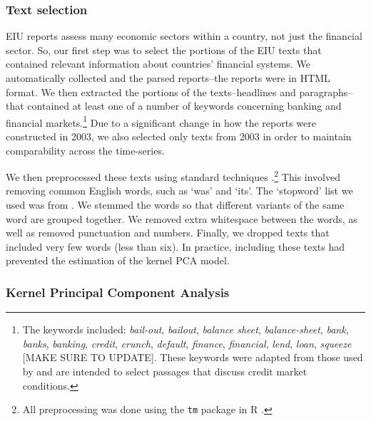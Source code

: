 \documentclass[]{article}
\begin{document}
\subsubsection{Text selection}\label{text-selection}

EIU reports assess many economic sectors within a country,
not just the financial sector. So, our first step was to select the
portions of the EIU texts that contained relevant information about
countries' financial systems. We automatically collected and the parsed
reports--the reports were in HTML format. We then extracted the portions
of the texts--headlines and paragraphs--that contained at least one of a
number of keywords concerning banking and financial markets.\footnote{The
  keywords included: \emph{bail-out}, \emph{bailout}, \emph{balance
  sheet}, \emph{balance-sheet}, \emph{bank}, \emph{banks},
  \emph{banking}, \emph{credit}, \emph{crunch}, \emph{default},
  \emph{finance}, \emph{financial}, \emph{lend}, \emph{loan},
  \emph{squeeze} {[}MAKE SURE TO UPDATE{]}. These keywords were adapted
  from those used by \cite{Romer2015} and are intended to
  select passages that discuss credit market conditions.} Due to a
significant change in how the reports were constructed in 2003, we also
selected only texts from 2003 in order to maintain comparability across
the time-series.

We then preprocessed these texts using standard techniques \citep[see][]{Grimmer2013}.\footnote{All preprocessing was done using the \texttt{tm} package \citep{tm2015} in R \citep{R-cite}.} This involved removing common English words, such as `was' and `its'. The `stopword' list we used was from \cite{dhillon:modha:mlj01}. We stemmed the words so that different variants of the same word are grouped together. We removed extra whitespace between the words, as well as removed punctuation and numbers. Finally, we dropped texts that included very few words (less than six). In practice, including these texts had prevented the estimation of the kernel PCA model.

\subsubsection{Kernel Principal Component
Analysis}\label{kernel-principal-component-analysis}
\end{document}

